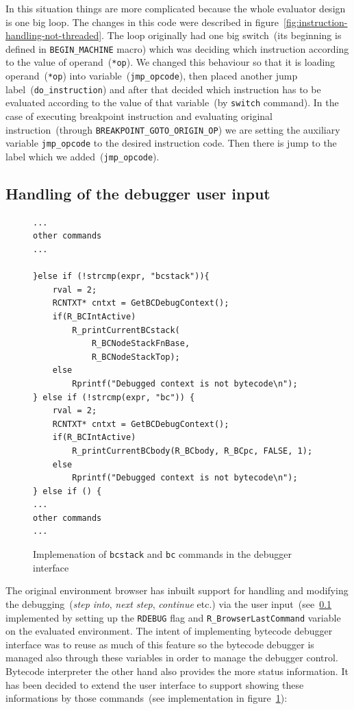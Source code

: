 \documentclass[thesis=M,english]{FITthesis}[2018/10/20]
\newcommand{\code}[1]{\texttt{#1}}
\begin{document}
{In this situation things are more complicated because the whole evaluator design is one big loop. The changes in this code were described in figure~\ref{fig:instruction-handling-not-threaded}. The loop originally had  one big switch~(its beginning is defined in \code{BEGIN{\_}MACHINE} macro) which was deciding which instruction according to the value of operand~(\code{*op}). We changed this behaviour so that it is loading operand~(\code{*op}) into variable~(\code{jmp{\_}opcode}), then placed another jump label~(\code{do{\_}instruction}) and after that decided which instruction has to be evaluated according to the value of that variable~(by \code{switch} command). In the case of executing breakpoint instruction and evaluating original instruction~(through \code{BREAKPOINT{\_}GOTO{\_}ORIGIN{\_}OP}) we are setting the auxiliary variable \code{jmp{\_}opcode} to the desired instruction code. Then there is jump to the label which we added~(\code{jmp{\_}opcode}).

\subsection{Handling of the debugger user input}\label{handling-debugger-user-input}

\begin{figure}[h]
\begin{lstlisting}
...
other commands
...

}else if (!strcmp(expr, "bcstack")){
    rval = 2;
    RCNTXT* cntxt = GetBCDebugContext();
    if(R_BCIntActive)
        R_printCurrentBCstack(
            R_BCNodeStackFnBase,
            R_BCNodeStackTop);
    else
        Rprintf("Debugged context is not bytecode\n");
} else if (!strcmp(expr, "bc")) {
    rval = 2;
    RCNTXT* cntxt = GetBCDebugContext();
    if(R_BCIntActive)
        R_printCurrentBCbody(R_BCbody, R_BCpc, FALSE, 1);
    else
        Rprintf("Debugged context is not bytecode\n");
} else if () {
...
other commands
...
\end{lstlisting}
	\caption{Implemenation of \code{bcstack} and \code{bc} commands in the debugger interface}\label{fig:implementation-of-bcstack-bc-commands}
\end{figure}

The original environment browser has inbuilt support for handling and modifying the debugging~(\textit{step into}, \textit{next step}, \textit{continue} etc.) via the user input~(see~\ref{handling-debugger-user-input} implemented by setting up the \code{RDEBUG} flag and \code{R{\_}BrowserLastCommand} variable on the evaluated environment. The intent of implementing bytecode debugger interface was to reuse as much of this feature so the bytecode debugger is managed also through these variables in order to manage the debugger control. Bytecode interpreter the other hand also provides the more status information. It has been decided to extend the user interface to support showing these informations by those commands~(see implementation in figure~\ref{fig:implementation-of-bcstack-bc-commands}):

}
\end{document}
